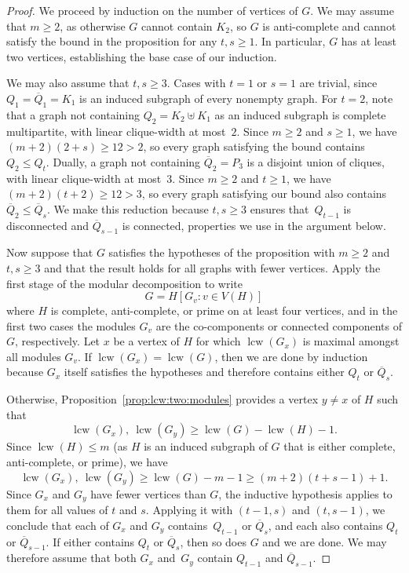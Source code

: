 \documentclass[10pt,a4paper]{amsart}
\newcommand{\lcw}{\operatorname{lcw}}
\begin{document}
\begin{proof}
We proceed by induction on the number of vertices of $G$. We may assume that $m\ge 2$, as otherwise $G$ cannot contain $K_2$, so $G$ is anti-complete and cannot satisfy the bound in the proposition for any $t,s\ge 1$. In particular, $G$ has at least two vertices, establishing the base case of our induction.

We may also assume that $t,s\ge 3$. Cases with $t=1$ or $s=1$ are trivial, since $Q_1=\overline{Q}_1=K_1$ is an induced subgraph of every nonempty graph. For $t=2$, note that a graph not containing $Q_2=K_2\uplus K_1$ as an induced subgraph is complete multipartite, with linear clique-width at most~$2$. Since $m\ge 2$ and $s\ge 1$, we have $(m+2)(2+s)\ge 12>2$, so every graph satisfying the bound contains $Q_2\le Q_t$. Dually, a graph not containing $\overline{Q}_2=P_3$ is a disjoint union of cliques, with linear clique-width at most~$3$. Since $m\ge 2$ and $t\ge 1$, we have $(m+2)(t+2)\ge 12>3$, so every graph satisfying our bound also contains $\overline{Q}_2\le\overline{Q}_s$. We make this reduction because $t,s\ge 3$ ensures that~$Q_{t-1}$ is disconnected and $\overline{Q}_{s-1}$ is connected, properties we use in the argument below.

%
%
%

Now suppose that $G$ satisfies the hypotheses of the proposition with $m\ge 2$ and $t,s\ge 3$ and that the result holds for all graphs with fewer vertices. Apply the first stage of the modular decomposition to write
\[
	G=H[G_v : v\in V(H)]
\]
where $H$ is complete, anti-complete, or prime on at least four vertices, and in the first two cases the modules $G_v$ are the co-components or connected components of $G$, respectively. Let $x$ be a vertex of $H$ for which $\lcw(G_x)$ is maximal amongst all modules $G_v$. If $\lcw(G_x)=\lcw(G)$, then we are done by induction because $G_x$ itself satisfies the hypotheses and therefore contains either $Q_t$ or $\overline{Q}_s$.

Otherwise, Proposition~\ref{prop:lcw:two:modules} provides a vertex $y\neq x$ of $H$ such that
\[
	\lcw(G_x),\ \lcw(G_y)
	\ge
	\lcw(G)-\lcw(H)-1.
\]
Since $\lcw(H)\le m$ (as $H$ is an induced subgraph of $G$ that is either complete, anti-complete, or prime), we have
\[
	\lcw(G_x),\ \lcw(G_y)
	\ge
	\lcw(G)-m-1
	\ge
	(m+2)(t+s-1)+1.
\]
Since $G_x$ and $G_y$ have fewer vertices than $G$, the inductive hypothesis applies to them for all values of $t$ and $s$. Applying it with $(t-1,s)$ and $(t,s-1)$, we conclude that each of $G_x$ and $G_y$ contains~$Q_{t-1}$ or $\overline{Q}_s$, and each also contains $Q_t$ or $\overline{Q}_{s-1}$. If either contains $Q_t$ or $\overline{Q}_s$, then so does $G$ and we are done. We may therefore assume that both $G_x$ and~$G_y$ contain $Q_{t-1}$ and $\overline{Q}_{s-1}$.


\end{proof}
\end{document}
